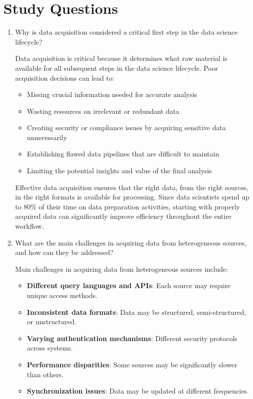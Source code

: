 \documentclass[12pt]{article}
\begin{document}
\section{Study Questions}

\begin{enumerate}
    \item Why is data acquisition considered a critical first step in the data science lifecycle?
    
    \begin{tcolorbox}[colback=blue!5!white,colframe=blue!75!black,title=Solution]
    Data acquisition is critical because it determines what raw material is available for all subsequent steps in the data science lifecycle. Poor acquisition decisions can lead to:
    
    \begin{itemize}
        \item Missing crucial information needed for accurate analysis
        \item Wasting resources on irrelevant or redundant data
        \item Creating security or compliance issues by acquiring sensitive data unnecessarily
        \item Establishing flawed data pipelines that are difficult to maintain
        \item Limiting the potential insights and value of the final analysis
    \end{itemize}
    
    Effective data acquisition ensures that the right data, from the right sources, in the right formats is available for processing. Since data scientists spend up to 80\% of their time on data preparation activities, starting with properly acquired data can significantly improve efficiency throughout the entire workflow.
    \end{tcolorbox}
    
    \item What are the main challenges in acquiring data from heterogeneous sources, and how can they be addressed?
    
    \begin{tcolorbox}[colback=blue!5!white,colframe=blue!75!black,title=Solution]
    Main challenges in acquiring data from heterogeneous sources include:
    
    \begin{itemize}
        \item \textbf{Different query languages and APIs}: Each source may require unique access methods.
        \item \textbf{Inconsistent data formats}: Data may be structured, semi-structured, or unstructured.
        \item \textbf{Varying authentication mechanisms}: Different security protocols across systems.
        \item \textbf{Performance disparities}: Some sources may be significantly slower than others.
        \item \textbf{Synchronization issues}: Data may be updated at different frequencies.
    \end{itemize}
    

\end{tcolorbox}
\end{enumerate}
\end{document}
